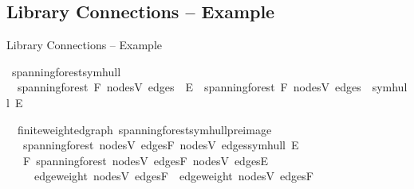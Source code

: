 \documentclass[%
	sans,
	12pt,
]{beamer}
\def\isacartoucheopen{}%
\def\isacartoucheclose{}%
\begin{document}
\subsection{Library Connections -- Example}
\begin{frame}{Library Connections -- Example}\pause
\begin{isabelle}
	\isamarkupfalse%
	\ spanning{\isacharunderscore}forest{\isacharunderscore}symhull{\isacharcolon}\isanewline
	\ \ {\isacartoucheopen}spanning{\isacharunderscore}forest\ F\ {\isasymlparr}nodes{\isacharequal}V{\isacharcomma}\ edges\ {\isacharequal}\ E{\isasymrparr}\ {\isasymLongrightarrow}\ spanning{\isacharunderscore}forest\ F\ {\isasymlparr}nodes{\isacharequal}V{\isacharcomma}\ edges\ {\isacharequal}\ symhull\ E{\isasymrparr}{\isacartoucheclose}
\end{isabelle}\pause
\begin{isabelle}
	\isamarkupfalse%
	\ {\isacharparenleft}\ finite{\isacharunderscore}weighted{\isacharunderscore}graph{\isacharparenright}\ spanning{\isacharunderscore}forest{\isacharunderscore}symhull{\isacharunderscore}preimage{\isacharcolon}\isanewline
	\ \ \ {\isacartoucheopen}spanning{\isacharunderscore}forest\ {\isasymlparr}nodes{\isacharequal}V{\isacharcomma}\ edges{\isacharequal}F{\isasymrparr}\ {\isasymlparr}nodes{\isacharequal}V{\isacharcomma}\ edges{\isacharequal}symhull\ E{\isasymrparr}{\isacartoucheclose}\isanewline
	\ \ \ {\isacartoucheopen}{\isasymexists}F{\isacharprime}{\isachardot}\ spanning{\isacharunderscore}forest\ {\isasymlparr}nodes{\isacharequal}V{\isacharcomma}\ edges{\isacharequal}F{\isacharprime}{\isasymrparr}\ {\isasymlparr}nodes{\isacharequal}V{\isacharcomma}\ edges{\isacharequal}E{\isasymrparr}\isanewline
	\ \ \ \ {\isasymand}\ edge{\isacharunderscore}weight\ {\isasymlparr}nodes{\isacharequal}V{\isacharcomma}\ edges{\isacharequal}F{\isacharprime}{\isasymrparr}\ {\isacharequal}\ edge{\isacharunderscore}weight\ {\isasymlparr}nodes{\isacharequal}V{\isacharcomma}\ edges{\isacharequal}F{\isasymrparr}{\isacartoucheclose}
\end{isabelle}
\end{frame}
\end{document}
